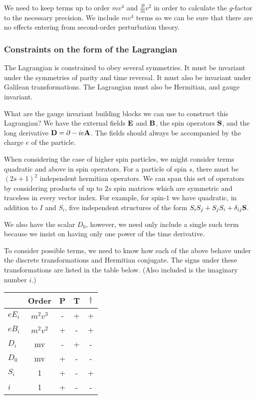 We need to keep terms up to order $mv^4$ and $\frac{B}{m} v^2$ in order to calculate the $g$-factor to the necessary precision.  We include $mv^4$ terms so we can be sure that there are no effects entering from second-order perturbation theory.


\subsubsection{Constraints on the form of the Lagrangian}
The Lagrangian is constrained to obey several symmetries.  It must be invariant under the symmetries of parity and time reversal.  It must also be invariant under Galilean transformations.  The Lagrangian must also be Hermitian, and gauge invariant.

What are the gauge invariant building blocks we can use to construct this Lagrangian?  We have the external fields $\mathbf{E}$ and $\mathbf{B}$, the spin operators $\mathbf{S}$, and the long derivative $\mathbf{D} = \mathbf{\partial} - i e\mathbf{A}$.  The fields should always be accompanied by the charge $e$ of the particle.

When considering the case of higher spin particles, we might consider terms quadratic and above in spin operators.  For a particle of spin $s$, there must be $(2s+1)^2$ independent hermitian operators.  We can span this set of operators by considering products of up to $2s$ spin matrices which are symmetric and traceless in every vector index.  For example, for spin-$1$ we have quadratic, in addition to $I$ and $S_i$, five independent structures of the form $ S_i S_j + S_j S_i + \delta_{ij} \mathbf{S}$.




We also have the scalar $D_0$, however, we need only include a single such term because we insist on having only one power of the time derivative.

To consider possible terms, we need to know how each of the above behave under the discrete transformations and Hermitian conjugate.  The signs under these transformations are listed in the table below.  (Also included is the imaginary number $i$.)


\begin{tabular}{l|c|ccc}
& Order	&	P	&	T	&	$\dagger$	\\
\hline
$eE_i$	&$m^2v^3$	&	-	& 	+	&	+		\\
$eB_i$	&$m^2v^2$	&	+	&   -	&	+		\\
$D_i$		& mv	&	-	&	+	&	-		\\
$D_0$		& mv	&	+	&	-	&	-		\\
$S_i$		& 1		&	+	&	-	&	+		\\
$i$		& 1		&	+	&	-	&	-		\\
\end{tabular}


